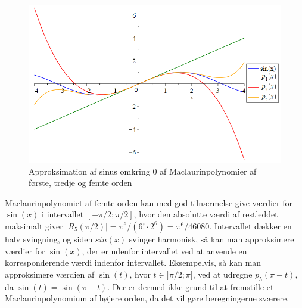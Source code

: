 \begin{figure}[H]
	\centering
	\includegraphics[scale=0.4]{fig/img/taylor_sin}
	\caption{Approksimation af sinus omkring 0 af Maclaurinpolynomier af første, tredje og femte orden}
 	\label{taylor_sin}
\end{figure}
Maclaurinpolynomiet af femte orden kan med god tilnærmelse give værdier for $\sin(x)$ i intervallet $[-\pi /2; \pi /2]$, hvor den absolutte værdi af restleddet maksimalt giver $\left\lvert R_5(\pi/2) \right\lvert = \pi^6/{(6! \cdot 2^6)} = \pi^6/{46080}$. Intervallet dækker en halv svingning, og siden $sin(x)$ svinger harmonisk, så kan man approksimere værdier for $\sin(x)$, der er udenfor intervallet ved at anvende en korresponderende værdi indenfor intervallet. Eksempelvis, så kan man approksimere værdien af $\sin(t)$, hvor $t \in ]\pi/2;\pi]$, ved at udregne $p_5(\pi-t)$, da $\sin(t) = \sin(\pi-t)$. Der er dermed ikke grund til at fremstille et Maclaurinpolynomium af højere orden, da det vil gøre beregningerne sværere.
